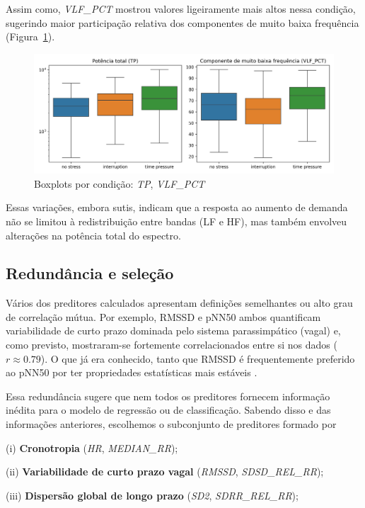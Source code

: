 \documentclass[conference]{IEEEtran}
\begin{document}
Assim como, \textit{VLF\_PCT} mostrou valores ligeiramente mais altos nessa condição, sugerindo maior participação relativa dos componentes de muito baixa frequência (Figura~\ref{fig:BXP_TP_VLFPCT}).

\begin{figure}[H]
    \centering
    \includegraphics[width=\linewidth]{../../../images/Anderson/box_tp_vlfpct_condition.png}
    \caption{Boxplots por condição: \textit{TP}, \textit{VLF\_PCT}}
    \label{fig:BXP_TP_VLFPCT}
\end{figure}

Essas variações, embora sutis, indicam que a resposta ao aumento de demanda não se limitou à redistribuição entre bandas (LF e HF), mas também envolveu alterações na potência total do espectro.

\subsection{Redundância e seleção}

Vários dos preditores calculados apresentam definições semelhantes ou alto grau de correlação mútua. Por exemplo, RMSSD e pNN50 ambos quantificam variabilidade de curto prazo dominada pelo sistema parassimpático (vagal) e, como previsto, mostraram-se fortemente correlacionados entre si nos dados ($r \approx 0.79$). O que já era conhecido, tanto que RMSSD é frequentemente preferido ao pNN50 por ter propriedades estatísticas mais estáveis \cite{R3}. 

Essa redundância sugere que nem todos os preditores fornecem informação inédita para o modelo de regressão ou de classificação. Sabendo disso e das informações anteriores, escolhemos o subconjunto de preditores formado por 

(i) \textbf{Cronotropia} (\textit{HR}, \textit{MEDIAN\_RR}); 

(ii) \textbf{Variabilidade de curto prazo vagal} (\textit{RMSSD}, \textit{SDSD\_REL\_RR}); 

(iii) \textbf{Dispersão global de longo prazo} (\textit{SD2}, \textit{SDRR\_REL\_RR}); 
\end{document}
